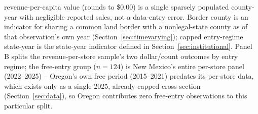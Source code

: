 \begin{table}[htbp]
\begin{minipage}{0.95\textwidth}
revenue-per-capita value (rounds to \$0.00) is a single sparsely populated county-year with negligible
reported sales, not a data-entry error. Border county is an indicator for sharing a common land border with a
nonlegal-state county as of that observation's own year (Section~\ref{sec:timevarying}); capped entry-regime
state-year is the state-year indicator defined in Section~\ref{sec:institutional}. Panel B splits the
revenue-per-store sample's two dollar/count outcomes by entry regime; the free-entry group ($n=124$) is New
Mexico's entire per-store panel (2022--2025) -- Oregon's own free period (2015--2021) predates its per-store
data, which exists only as a single 2025, already-capped cross-section (Section~\ref{sec:data}), so Oregon
contributes zero free-entry observations to this particular split.
\end{minipage}
\end{table}
